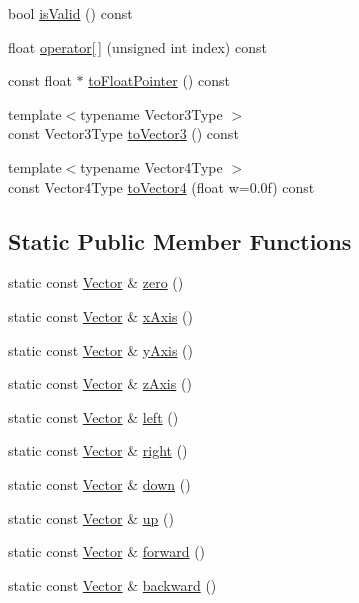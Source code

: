 \begin{DoxyCompactItemize}
\item 
bool \hyperlink{struct_leap_1_1_vector_a8de2566e35891a7a3856effb7d7df919}{is\+Valid} () const
\item 
float \hyperlink{struct_leap_1_1_vector_ac6c64bca87edb6a37975f9cec4a49281}{operator\mbox{[}$\,$\mbox{]}} (unsigned int index) const
\item 
const float $\ast$ \hyperlink{struct_leap_1_1_vector_a171112c7b5074572356a7b6fab788ca2}{to\+Float\+Pointer} () const
\item 
{\footnotesize template$<$typename Vector3\+Type $>$ }\\const Vector3\+Type \hyperlink{struct_leap_1_1_vector_abb86de3a3467f83a51ce79170eae66ed}{to\+Vector3} () const
\item 
{\footnotesize template$<$typename Vector4\+Type $>$ }\\const Vector4\+Type \hyperlink{struct_leap_1_1_vector_aad4866e49b58bcdf52398459f27d0e81}{to\+Vector4} (float w=0.\+0f) const
\end{DoxyCompactItemize}
\subsection*{Static Public Member Functions}
\begin{DoxyCompactItemize}
\item 
static const \hyperlink{struct_leap_1_1_vector}{Vector} \& \hyperlink{struct_leap_1_1_vector_a743b469003fa6622a00ff277d2481da9}{zero} ()
\item 
static const \hyperlink{struct_leap_1_1_vector}{Vector} \& \hyperlink{struct_leap_1_1_vector_a0d90c96672e7ee90fb510d7b96c32861}{x\+Axis} ()
\item 
static const \hyperlink{struct_leap_1_1_vector}{Vector} \& \hyperlink{struct_leap_1_1_vector_a9a387eb8ab05e55708542c031c641f31}{y\+Axis} ()
\item 
static const \hyperlink{struct_leap_1_1_vector}{Vector} \& \hyperlink{struct_leap_1_1_vector_a6ec3652d02a9599bc2a00411a1e05501}{z\+Axis} ()
\item 
static const \hyperlink{struct_leap_1_1_vector}{Vector} \& \hyperlink{struct_leap_1_1_vector_a315ffbbd7f686e1d93bffc6beb11f89d}{left} ()
\item 
static const \hyperlink{struct_leap_1_1_vector}{Vector} \& \hyperlink{struct_leap_1_1_vector_aa4d509a1640d9aa270d095c9ae8e44f2}{right} ()
\item 
static const \hyperlink{struct_leap_1_1_vector}{Vector} \& \hyperlink{struct_leap_1_1_vector_ac1c62a2d280d7a7c67e99f1996076b58}{down} ()
\item 
static const \hyperlink{struct_leap_1_1_vector}{Vector} \& \hyperlink{struct_leap_1_1_vector_a0a38a683c0224b38b75d58db24f51adf}{up} ()
\item 
static const \hyperlink{struct_leap_1_1_vector}{Vector} \& \hyperlink{struct_leap_1_1_vector_a79b32a38e4c99b6ddbf94ac22680d405}{forward} ()
\item 
static const \hyperlink{struct_leap_1_1_vector}{Vector} \& \hyperlink{struct_leap_1_1_vector_a82ea3abc8ae6bb144a5946836fce88ad}{backward} ()
\end{DoxyCompactItemize}
